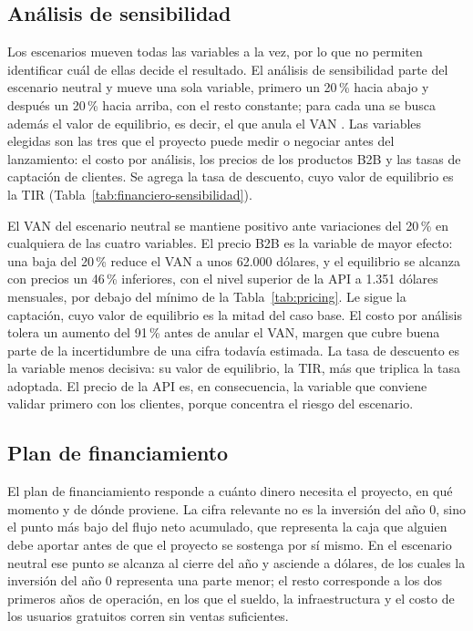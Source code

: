 \subsection{Análisis de sensibilidad}

Los escenarios mueven todas las variables a la vez, por lo que no permiten identificar cuál de ellas decide el resultado. El análisis de sensibilidad parte del escenario neutral y mueve una sola variable, primero un 20\,\% hacia abajo y después un 20\,\% hacia arriba, con el resto constante; para cada una se busca además el valor de equilibrio, es decir, el que anula el VAN \parencite{SapagEtAl2014}. Las variables elegidas son las tres que el proyecto puede medir o negociar antes del lanzamiento: el costo por análisis, los precios de los productos B2B y las tasas de captación de clientes. Se agrega la tasa de descuento, cuyo valor de equilibrio es la TIR (Tabla~\ref{tab:financiero-sensibilidad}).



El VAN del escenario neutral se mantiene positivo ante variaciones del 20\,\% en cualquiera de las cuatro variables. El precio B2B es la variable de mayor efecto: una baja del 20\,\% reduce el VAN a unos 62.000 dólares, y el equilibrio se alcanza con precios un 46\,\% inferiores, con el nivel superior de la API a 1.351 dólares mensuales, por debajo del mínimo de la Tabla~\ref{tab:pricing}. Le sigue la captación, cuyo valor de equilibrio es la mitad del caso base. El costo por análisis tolera un aumento del 91\,\% antes de anular el VAN, margen que cubre buena parte de la incertidumbre de una cifra todavía estimada. La tasa de descuento es la variable menos decisiva: su valor de equilibrio, la TIR, más que triplica la tasa adoptada. El precio de la API es, en consecuencia, la variable que conviene validar primero con los clientes, porque concentra el riesgo del escenario.

\subsection{Plan de financiamiento}

El plan de financiamiento responde a cuánto dinero necesita el proyecto, en qué momento y de dónde proviene. La cifra relevante no es la inversión del año 0, sino el punto más bajo del flujo neto acumulado, que representa la caja que alguien debe aportar antes de que el proyecto se sostenga por sí mismo. En el escenario neutral ese punto se alcanza al cierre del año \finNeuAnioNecesidad{} y asciende a \finNeuNecesidad{} dólares, de los cuales la inversión del año 0 representa una parte menor; el resto corresponde a los dos primeros años de operación, en los que el sueldo, la infraestructura y el costo de los usuarios gratuitos corren sin ventas suficientes.

